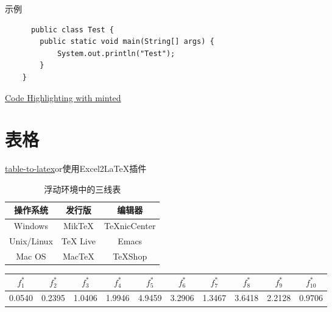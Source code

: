 \documentclass[12pt]{ctexart} %
\begin{document}
示例
\begin{verbatim}
      public class Test {
        public static void main(String[] args) {
            System.out.println("Test");
        }
    }
\end{verbatim}
\href{https://www.overleaf.com/learn/latex/Code_Highlighting_with_minted}{Code Highlighting with minted}
    
\section{表格}
\href{https://tableconvert.com/csv-to-latex}{table-to-latex}or使用Excel2LaTeX插件


\begin{table}[htbp]
    \caption{浮动环境中的三线表}
    \centering
    \begin{tabular}{c c c}
        \toprule[2pt]
        操作系统 & 发行版 & 编辑器 \\
        \midrule
        Windows & MikTeX & TeXnicCenter \\
        Unix/Linux & TeX Live & Emacs \\
        Mac OS & MacTeX & TeXShop \\
        \bottomrule[2pt]
    \end{tabular}
\end{table}

\begin{table}[htbp]
	\centering
	\begin{tabular}{cccccccccc}
		\toprule[2pt]
		$f_{1}^{*}$& $f_{2}^{*}$ & $f_{3}^{*}$ & $f_{4}^{*}$ & $f_{5}^{*}$&$f_{6}^{*}$&$f_{7}^{*}$&$f_{8}^{*}$&$f_{9}^{*}$&$f_{10}^{*}$ \\ 
		\hline
		0.0540&  0.2395& 1.0406 & 1.9946 &4.9459 &3.2906&1.3467&3.6418&2.2128&0.9706 \\ 
		\bottomrule[2pt]
	\end{tabular} 
\end{table}
\end{document}
